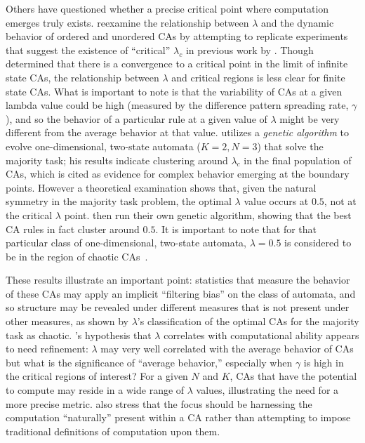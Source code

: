 \documentclass[a4paper,11pt,twoside]{report}
\begin{document}
Others have questioned whether a precise critical point where computation emerges truly exists. \citeauthor{mi93} reexamine the relationship between $\lambda$ and the dynamic behavior of ordered and unordered CAs by attempting to replicate experiments that suggest the existence of ``critical'' $\lambda_c$ in previous work by \citeauthor{pa88}. Though \citeauthor{wo90} determined that there is a convergence to a critical point in the limit of infinite state CAs, the relationship between $\lambda$ and critical regions is less clear for finite state CAs. What is important to note is that the variability of CAs at a given lambda value could be high (measured by the difference pattern spreading rate, $\gamma$), and so the behavior of a particular rule at a given value of $\lambda$ might be very different from the average behavior at that value. \citeauthor{pa88} utilizes a \textit{genetic algorithm} to evolve one-dimensional, two-state automata ($K=2, N=3$) that solve the majority task; his results indicate clustering around $\lambda_c$ in the final population of CAs, which is cited as evidence for complex behavior emerging at the boundary points. However a theoretical examination shows that, given the natural symmetry in the majority task problem, the optimal $\lambda$ value occurs at $0.5$, not at the critical $\lambda$ point. \citeauthor{mi93} then run their own genetic algorithm, showing that the best CA rules in fact cluster around $0.5$. It is important to note that for that particular class of one-dimensional, two-state automata, $\lambda = 0.5$ is considered to be in the region of chaotic CAs~\cite{mi93}. 

These results illustrate an important point: statistics that measure the behavior of these CAs may apply an implicit ``filtering bias'' on the class of automata, and so structure may be revealed under different measures that is not present under other measures, as shown by $\lambda$'s classification of the optimal CAs for the majority task as chaotic. \citeauthor{la90}'s hypothesis that $\lambda$ correlates with computational ability appears to need refinement: $\lambda$ may very well correlated with the average behavior of CAs but what is the significance of  ``average behavior,''  especially when $\gamma$ is high in the critical regions of interest? For a given $N$ and $K$, CAs that have the potential to compute may reside in a wide range of $\lambda$ values, illustrating the need for a more precise metric. \citeauthor{mi93} also stress that the focus should be harnessing the computation ``naturally'' present within a CA rather than attempting to impose traditional definitions of computation upon them. 
\end{document}
